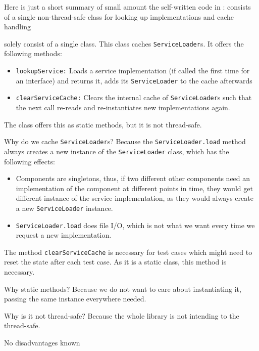 Here is just a short summary of small amount the self-written code in \COMPcomponentRegistry{}:
{%
\COMPcomponentRegistry{} consists of a single non-thread-safe class for looking up implementations and cache handling
}
{%
\COMPcomponentRegistry{} solely consist of a single class. This class caches \texttt{ServiceLoader}s. It offers the following methods:
\begin{itemize}
\item \texttt{lookupService:} Loads a service implementation (if called the first time for an interface) and returns it, adds its \texttt{ServiceLoader} to the cache afterwards
\item \texttt{clearServiceCache:} Clears the internal cache of \texttt{ServiceLoader}s such that the next call re-reads and re-instantiates new implementations again.
\end{itemize}
The class offers this as static methods, but it is not thread-safe.
}
{%
Why do we cache \texttt{ServiceLoader}s? Because the \texttt{ServiceLoader.load} method always creates a new instance of the \texttt{ServiceLoader} class, which has the following effects:
\begin{itemize}
\item Components are singletons, thus, if two different other components need an implementation of the component at different points in time, they would get different instance of the service implementation, as they would always create a new \texttt{ServiceLoader} instance.
\item \texttt{ServiceLoader.load} does file I/O, which is not what we want every time we request a new implementation.
\end{itemize}

The method \texttt{clearServiceCache} is necessary for test cases which might need to reset the \COMPcomponentRegistry{} state after each test case. As it is a static class, this method is necessary.

Why static methods? Because we do not want to care about instantiating it, passing the same instance everywhere needed.

Why is it not thread-safe? Because the whole library is not intending to the thread-safe.
}
{%
No disadvantages known
}


